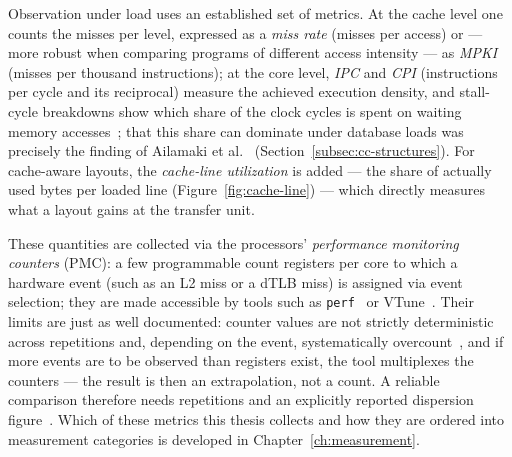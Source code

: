 Observation under load uses an established set of metrics. At the cache level one counts the misses
per level, expressed as a \emph{miss rate} (misses per access) or --- more robust when comparing
programs of different access intensity --- as \emph{MPKI} (misses per thousand instructions); at
the core level, \emph{IPC} and \emph{CPI} (instructions per cycle and its reciprocal) measure the
achieved execution density, and stall-cycle breakdowns show which share of the clock cycles is
spent on waiting memory accesses~\cite{hennessy2019architecture}; that this share can dominate
under database loads was precisely the finding of Ailamaki et al.~\cite{ailamaki1999dbms}
(Section~\ref{subsec:cc-structures}). For cache-aware layouts, the \emph{cache-line utilization} is
added --- the share of actually used bytes per loaded line (Figure~\ref{fig:cache-line}) --- which
directly measures what a layout gains at the transfer unit.

These quantities are collected via the processors' \emph{performance monitoring counters} (PMC): a
few programmable count registers per core to which a hardware event (such as an L2 miss or a dTLB
miss) is assigned via event selection; they are made accessible by tools such as
\texttt{perf}~\cite{demelo2010perf} or VTune~\cite{reinders2005vtune}. Their limits are just as
well documented: counter values are not strictly deterministic across repetitions and, depending on
the event, systematically overcount~\cite{weaver2008counters}, and if more events are to be
observed than registers exist, the tool multiplexes the counters --- the result is then an
extrapolation, not a count. A reliable comparison therefore needs repetitions and an explicitly
reported dispersion figure~\cite{hoefler2015benchmarking,weaver2008counters}. Which of these metrics
this thesis collects and how they are ordered into measurement categories is developed in
Chapter~\ref{ch:measurement}.

